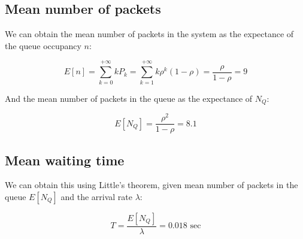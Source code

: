 \documentclass{article}
\begin{document}
\subsection{Mean number of packets}

We can obtain the mean number of packets in the system as the expectance of the queue occupancy $n$:

\begin{equation}
  E[n]=\sum_{k=0}^{+\infty}kP_k=\sum_{k=1}^{+\infty}k\rho^k(1-\rho)=\frac{\rho}{1-\rho}=9
\end{equation}

And the mean number of packets in the queue as the expectance of $N_Q$:

\begin{equation}
  E[N_Q]=\frac{\rho^2}{1-\rho}=8.1
\end{equation}

\subsection{Mean waiting time}

We can obtain this using Little's theorem, given mean number of packets in the queue $E[N_Q]$ and the arrival rate $\lambda$:

\begin{equation}
  T=\frac{E[N_Q]}{\lambda}=0.018 \text{ sec}
\end{equation}

\pagestyle{fancy}
\fancyhead{}
\end{document}
